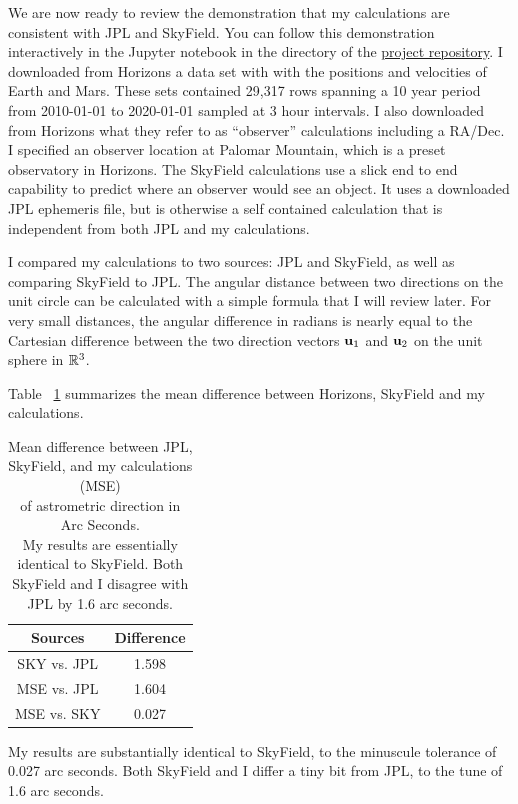 We are now ready to review the demonstration that my calculations are consistent with JPL and SkyField.
You can follow this demonstration interactively in the Jupyter notebook 
 in the  directory of the \href{https://github.com/memanuel/kepler-sieve}{project repository}.
I downloaded from Horizons a data set with with the positions and velocities of Earth and Mars.
These sets contained 29,317 rows spanning a 10 year period from 2010-01-01 to 2020-01-01 sampled at 3 hour intervals.
I also downloaded from Horizons what they refer to as ``observer'' calculations including a RA/Dec.
I specified an observer location at Palomar Mountain, which is a preset observatory in Horizons.
The SkyField calculations use a slick end to end capability to predict where an observer would see an object.
It uses a downloaded JPL ephemeris file, but is otherwise a self contained calculation that is independent from both JPL and my calculations.

I compared my calculations to two sources: JPL and SkyField, as well as comparing SkyField to JPL.
The angular distance between two directions on the unit circle can be calculated with a simple formula that I will review later.  
For very small distances, the angular difference in radians is nearly equal to the Cartesian difference between the two direction
vectors $\mathbf{u}_1$ and $\mathbf{u}_2$ on the unit sphere in $\mathbb{R}^3$.

Table ~\ref{tbl:DirectionComparison} summarizes the mean difference between Horizons, SkyField and my calculations.
\begin{table}
\begin{centering}
\begin{tabular}{|c | c|}
\hline
Sources & Difference \\
\hline
SKY vs. JPL & 1.598 \\
MSE vs. JPL & 1.604 \\
MSE vs. SKY & 0.027 \\
\hline
\end{tabular}
\caption[Mean difference between JPL, SkyField, and my calculations of astrometric direction]
{Mean difference between JPL, SkyField, and my calculations (MSE) \\
of astrometric direction in Arc Seconds.\\
My results are essentially identical to SkyField.  Both SkyField and I disagree with JPL by 1.6 arc seconds.}
\label{tbl:DirectionComparison}
\end{centering}
\end{table}
My results are substantially identical to SkyField, to the minuscule tolerance of 0.027 arc seconds.
Both SkyField and I differ a tiny bit from JPL, to the tune of 1.6 arc seconds.

